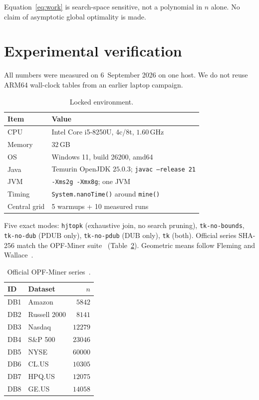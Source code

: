 \documentclass[preprint,12pt]{elsarticle}
\newcommand{\DUB}{\mathrm{DUB}}
\newcommand{\PDUB}{\mathrm{PDUB}}
\theoremstyle{plain}
\theoremstyle{definition}
\theoremstyle{remark}
\begin{document}
Equation~\eqref{eq:work} is search-space sensitive, not a polynomial in $n$ alone. No claim of asymptotic global optimality is made.

\section{Experimental verification}
\label{sec:exp}

All numbers were measured on 6~September 2026 on one host. We do not reuse ARM64 wall-clock tables from an earlier laptop campaign.

\begin{table}[t]
\caption{Locked environment.}
\label{tab:env}
\centering
\begin{tabular}{@{}ll@{}}
\toprule
Item & Value \\
\midrule
CPU & Intel Core i5-8250U, 4c/8t, $1.60$\,GHz \\
Memory & $32$\,GB \\
OS & Windows 11, build 26200, amd64 \\
Java & Temurin OpenJDK $25.0.3$; \texttt{javac --release 21} \\
JVM & \texttt{-Xms2g -Xmx8g}; one JVM \\
Timing & \texttt{System.nanoTime()} around \texttt{mine()} \\
Central grid & 5 warmups + 10 measured runs \\
\bottomrule
\end{tabular}
\end{table}

Five exact modes: \texttt{hjtopk} (exhaustive join, no search pruning), \texttt{tk-no-bounds}, \texttt{tk-no-dub} ($\PDUB$ only), \texttt{tk-no-pdub} ($\DUB$ only), \texttt{tk} (both). Official series SHA-256 match the OPF-Miner suite~\cite{OPFCode2024} (Table~\ref{tab:data}). Geometric means follow Fleming and Wallace~\cite{Fleming1986}.

\begin{table}[t]
\caption{Official OPF-Miner series~\cite{OPFCode2024}.}
\label{tab:data}
\centering
\footnotesize
\begin{tabular}{@{}llr@{}}
\toprule
ID & Dataset & $n$ \\
\midrule
DB1 & Amazon & $5842$ \\
DB2 & Russell 2000 & $8141$ \\
DB3 & Nasdaq & $12279$ \\
DB4 & S\&P 500 & $23046$ \\
DB5 & NYSE & $60000$ \\
DB6 & CL.US & $10305$ \\
DB7 & HPQ.US & $12075$ \\
DB8 & GE.US & $14058$ \\
\bottomrule
\end{tabular}
\end{table}
\end{document}
